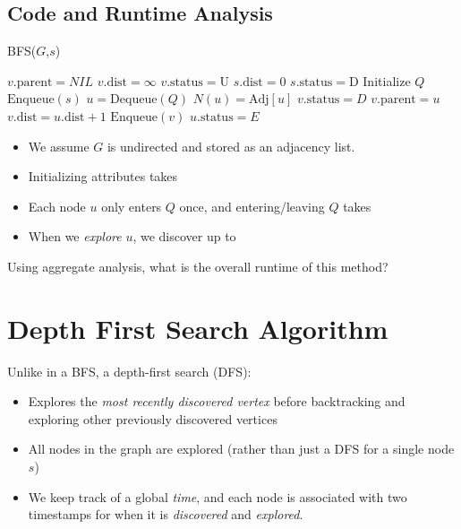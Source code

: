 \documentclass[11  pt]{exam}
\begin{document}
	
	
	
	\newpage
	
	\subsection{Code and Runtime Analysis}
	\begin{algorithm}[t]
		\textsc{BFS}($G$,$s$)
		\begin{algorithmic}
			\State $v.\text{parent} = NIL$
			\State $v.\text{dist} = \infty$
			\State $v.\text{status} = \text{U}$
			\EndFor
			\State $s.\text{dist} = 0$
			\State $s.\text{status} = \text{D}$
			\State Initialize $Q$
			\State $\text{Enqueue}(s)$
			\State $u = \text{Dequeue}(Q)$
			\State $N(u) = \text{Adj}[u]$
			\State $v.\text{status} = D$
			\State $v.\text{parent} = u$
			\State $v.\text{dist} = u.\text{dist} + 1$
			\State $\text{Enqueue}(v)$
			\EndIf
			\EndFor
			\State $u.\text{status} = E$
			\EndWhile
		\end{algorithmic}
	\end{algorithm}
	
	
	\begin{itemize}
		\item We assume $G$ is undirected and stored as an adjacency list.
		\item Initializing attributes takes 
		\item Each node $u$ only enters $Q$ once, and entering/leaving $Q$ takes 
		\item When we \emph{explore} $u$, we discover up to 
	\end{itemize}
	Using aggregate analysis, what is the overall runtime of this method? \\

	
	\newpage
	
	\section{Depth First Search Algorithm}
	Unlike in a BFS, a depth-first search (DFS):
	\begin{itemize}
		\item Explores the \emph{most recently discovered vertex} before backtracking and exploring other previously discovered vertices
		\item All nodes in the graph are explored (rather than just a DFS for a single node $s$)
		\item We keep track of a global \emph{time}, and each node is associated with two timestamps for when it is \emph{discovered} and \emph{explored}.
	\end{itemize}
	
\end{document}

